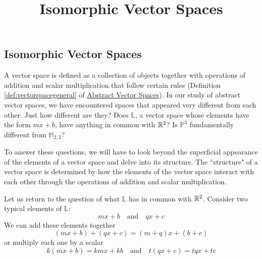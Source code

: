 \documentclass{ximera}
\title{Isomorphic Vector Spaces} \license{CC BY-NC-SA 4.0}
\begin{document}
\begin{abstract}
\end{abstract}
\maketitle

\begin{onlineOnly}
\section*{Isomorphic Vector Spaces}
\end{onlineOnly}

A vector space is defined as a collection of objects together with operations of addition and scalar multiplication that follow certain rules (Definition \ref{def:vectorspacegeneral} of \href{https://ximera.osu.edu/linearalgebradzv3/LinearAlgebraInteractiveIntro/VSP-0050/main}{Abstract Vector Spaces}).  In our study of abstract vector spaces, we have encountered spaces that appeared very different from each other.  Just how different are they?  Does $\mathbb{L}$, a vector space whose elements have the form $mx+b$, have anything in common with $\mathbb{R}^2$?  Is $\mathbb{P}^3$ fundamentally different from $\mathbb{M}_{2,2}$?

To answer these questions, we will have to look beyond the superficial appearance of the elements of a vector space and delve into its structure.  The ``structure" of a vector space is determined by how the elements of the vector space interact with each other through the operations of addition and scalar multiplication.  

Let us return to the question of what $\mathbb{L}$ has in common with $\mathbb{R}^2$.  Consider two typical elements of $\mathbb{L}$:
\begin{equation}\label{eq:iso1}
    mx+b\quad\text{and}\quad qx+c
\end{equation}
We can add these elements together
\begin{equation}\label{eq:iso2}
(mx+b)+(qx+c)=(m+q)x+(b+c)\end{equation}
or multiply each one by a scalar
\begin{equation}\label{eq:iso3}
k(mx+b)=kmx+kb\quad\text{and}\quad t(qx+c)=tqx+tc\end{equation}
\end{document}
